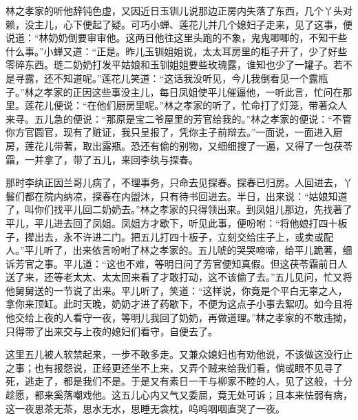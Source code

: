 \begin{parag}
    林之孝家的听他辞钝色虚，又因近日玉钏儿说那边正房内失落了东西，几个丫头对赖，没主儿，心下便起了疑。可巧小蝉、莲花儿并几个媳妇子走来，见了这事，便说道：“林奶奶倒要审审他。这两日他往这里头跑的不象，鬼鬼唧唧的，不知干些什么事。”小蝉又道：“正是。昨儿玉钏姐姐说，太太耳房里的柜子开了，少了好些零碎东西。琏二奶奶打发平姑娘和玉钏姐姐要些玫瑰露，谁知也少了一罐子。若不是寻露，还不知道呢。”莲花儿笑道：“这话我没听见，今儿我倒看见一个露瓶子。”林之孝家的正因这些事没主儿，每日凤姐使平儿催逼他，一听此言，忙问在那里。莲花儿便说：“在他们厨房里呢。”林之孝家的听了，忙命打了灯笼，带著众人来寻。五儿急的便说：“那原是宝二爷屋里的芳官给我的。”林之孝家的便说：“不管你方官圆官，现有了赃证，我只呈报了，凭你主子前辩去。”一面说，一面进入厨房，莲花儿带著，取出露瓶。恐还有偷的别物，又细细搜了一遍，又得了一包茯苓霜，一并拿了，带了五儿，来回李纨与探春。
\end{parag}


\begin{parag}
    那时李纨正因兰哥儿病了，不理事务，只命去见探春。探春已归房。人回进去，丫鬟们都在院内纳凉，探春在内盥沐，只有待书回进去。半日，出来说：“姑娘知道了，叫你们找平儿回二奶奶去。”林之孝家的只得领出来。到凤姐儿那边，先找著了平儿，平儿进去回了凤姐。凤姐方才歇下，听见此事，便吩咐：“将他娘打四十板子，撵出去，永不许进二门。把五儿打四十板子，立刻交给庄子上，或卖或配人。”平儿听了，出来依言吩咐了林之孝家的。五儿唬的哭哭啼啼，给平儿跪著，细诉芳官之事。平儿道：“这也不难，等明日问了芳官便知真假。但这茯苓霜前日人送了来，还等老太太、太太回来看了才敢打动，这不该偷了去。”五儿见问，忙又将他舅舅送的一节说了出来。平儿听了，笑道：“这样说，你竟是个平白无辜之人，拿你来顶缸。此时天晚，奶奶才进了药歇下，不便为这点子小事去絮叨。如今且将他交给上夜的人看守一夜，等明儿我回了奶奶，再做道理。”林之孝家的不敢违拗，只得带了出来交与上夜的媳妇们看守，自便去了。
\end{parag}


\begin{parag}
    这里五儿被人软禁起来，一步不敢多走。又兼众媳妇也有劝他说，不该做这没行止之事；也有报怨说，正经更还坐不上来，又弄个贼来给我们看，倘或眼不见寻了死，逃走了，都是我们不是。于是又有素日一干与柳家不睦的人，见了这般，十分趁愿，都来奚落嘲戏他。这五儿心内又气又委屈，竟无处可诉；且本来怯弱有病，这一夜思茶无茶，思水无水，思睡无衾枕，呜呜咽咽直哭了一夜。
\end{parag}


